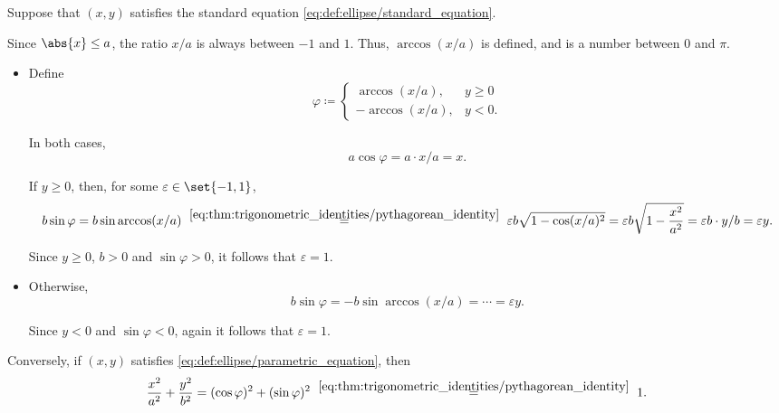 \begin{defproof}
   Suppose that \( (x, y) \) satisfies the standard equation \eqref{eq:def:ellipse/standard_equation}.

  Since \( \abs{x} \leq a \), the ratio \( x / a \) is always between \( -1 \) and \( 1 \). Thus, \( \arccos(x / a) \) is defined, and is a number between \( 0 \) and \( \pi \).

  \begin{itemize}
    \item Define
    \begin{equation*}
      \varphi \coloneqq \begin{cases}
        \arccos(x / a),  &y \geq 0 \\
        -\arccos(x / a), &y < 0.
      \end{cases}
    \end{equation*}

    In both cases,
    \begin{equation*}
      a \cos\varphi = a \cdot x / a = x.
    \end{equation*}

    If \( y \geq 0 \), then, for some \( \varepsilon \in \set{ -1, 1 } \),
    \begin{equation*}
      b \sin\varphi
      =
      b \sin\arccos(x / a)
      \reloset {\eqref{eq:thm:trigonometric_identities/pythagorean_identity}} =
      \varepsilon b \sqrt{ 1 - \cos(x / a)^2 }
      =
      \varepsilon b \sqrt{ 1 - \frac {x^2} {a^2} }
      =
      \varepsilon b \cdot y / b
      =
      \varepsilon y.
    \end{equation*}

    Since \( y \geq 0 \), \( b > 0 \) and \( \sin\varphi > 0 \), it follows that \( \varepsilon = 1 \).

    \item Otherwise,
    \begin{equation*}
      b \sin\varphi
      =
      -b \sin\arccos(x / a)
      =
      \cdots
      =
      \varepsilon y.
    \end{equation*}

    Since \( y < 0 \) and \( \sin\varphi < 0 \), again it follows that \( \varepsilon = 1 \).
  \end{itemize}

   Conversely, if \( (x, y) \) satisfies \eqref{eq:def:ellipse/parametric_equation}, then
  \begin{equation*}
    \frac {x^2} {a^2} + \frac {y^2} {b^2}
    =
    (\cos \varphi)^2 + (\sin \varphi)^2
    \reloset {\eqref{eq:thm:trigonometric_identities/pythagorean_identity}} =
    1.
  \end{equation*}


\end{defproof}
